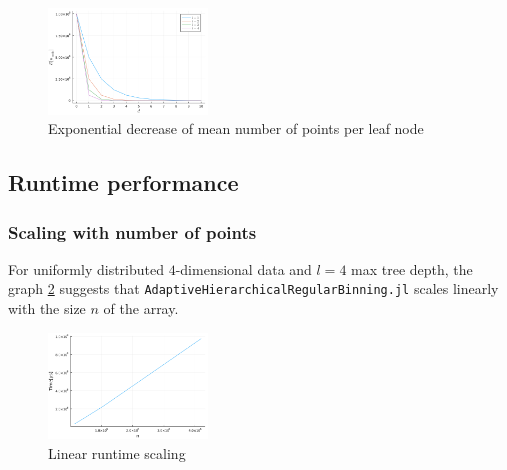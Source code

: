 \documentclass{juliacon}
\begin{document}
\begin{figure}[!ht]
  \centerline{
    \includegraphics[width=10pc]{figures/experiments/b_vs_d.png}
  }
  \caption{ Exponential decrease of mean number of points per leaf node }
  \label{b_vs_d}
\end{figure}


\subsection{Runtime performance}
\subsubsection{Scaling with number of points}
For uniformly distributed $4$-dimensional data and $l=4$ max tree depth, the graph
\ref{scale_n} suggests that \verb|AdaptiveHierarchicalRegularBinning.jl| scales
linearly with the size $n$ of the array.

\begin{figure}[!ht]
  \centerline{
    \includegraphics[width=10pc]{figures/experiments/scale_n.png}
  }
  \caption{ Linear runtime scaling }
  \label{scale_n}
\end{figure}
\end{document}
